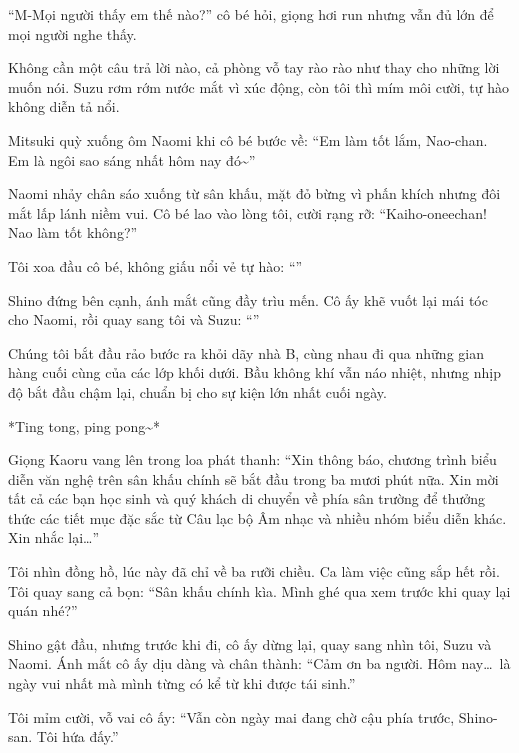 \documentclass[../main.tex]{subfiles}
\begin{document}
``M-Mọi người thấy em thế nào?'' cô bé hỏi, giọng hơi run nhưng vẫn đủ lớn để mọi người nghe thấy.

Không cần một câu trả lời nào, cả phòng vỗ tay rào rào như thay cho những lời muốn nói. Suzu rơm rớm nước mắt vì xúc động, còn tôi thì mím môi cười, tự hào không diễn tả nổi.

Mitsuki quỳ xuống ôm Naomi khi cô bé bước về: ``Em làm tốt lắm, Nao-chan. Em là ngôi sao sáng nhất hôm nay đó\~{}''

Naomi nhảy chân sáo xuống từ sân khấu, mặt đỏ bừng vì phấn khích nhưng đôi mắt lấp lánh niềm vui. Cô bé lao vào lòng tôi, cười rạng rỡ: ``Kaiho-oneechan! Nao làm tốt không?''

Tôi xoa đầu cô bé, không giấu nổi vẻ tự hào: ``''

Shino đứng bên cạnh, ánh mắt cũng đầy trìu mến. Cô ấy khẽ vuốt lại mái tóc cho Naomi, rồi quay sang tôi và Suzu: ``''

Chúng tôi bắt đầu rảo bước ra khỏi dãy nhà B, cùng nhau đi qua những gian hàng cuối cùng của các lớp khối dưới. Bầu không khí vẫn náo nhiệt, nhưng nhịp độ bắt đầu chậm lại, chuẩn bị cho sự kiện lớn nhất cuối ngày.

\ct

*Ting tong, ping pong\~{}*

Giọng Kaoru vang lên trong loa phát thanh: ``Xin thông báo, chương trình biểu diễn văn nghệ trên sân khấu chính sẽ bắt đầu trong ba mươi phút nữa. Xin mời tất cả các bạn học sinh và quý khách di chuyển về phía sân trường để thưởng thức các tiết mục đặc sắc từ Câu lạc bộ Âm nhạc và nhiều nhóm biểu diễn khác. Xin nhắc lại\dots''

Tôi nhìn đồng hồ, lúc này đã chỉ về ba rưỡi chiều. Ca làm việc cũng sắp hết rồi. Tôi quay sang cả bọn: ``Sân khấu chính kìa. Mình ghé qua xem trước khi quay lại quán nhé?''

Shino gật đầu, nhưng trước khi đi, cô ấy dừng lại, quay sang nhìn tôi, Suzu và Naomi. Ánh mắt cô ấy dịu dàng và chân thành: ``Cảm ơn ba người. Hôm nay\dots\ là ngày vui nhất mà mình từng có kể từ khi được tái sinh.''

Tôi mỉm cười, vỗ vai cô ấy: ``Vẫn còn ngày mai đang chờ cậu phía trước, Shino-san. Tôi hứa đấy.''
\end{document}
